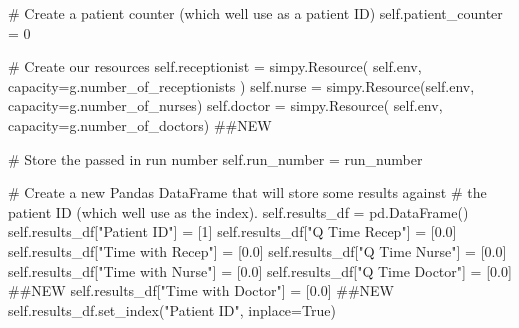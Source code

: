 \documentclass[
  letterpaper,
  DIV=11,
  numbers=noendperiod]{scrreprt}
\newenvironment{Shaded}{}{}
\newcommand{\CommentTok}[1]{\textcolor[rgb]{0.42,0.45,0.49}{#1}}
\newcommand{\DecValTok}[1]{\textcolor[rgb]{0.00,0.36,0.77}{#1}}
\newcommand{\FloatTok}[1]{\textcolor[rgb]{0.00,0.36,0.77}{#1}}
\newcommand{\NormalTok}[1]{\textcolor[rgb]{0.14,0.16,0.18}{#1}}
\newcommand{\OperatorTok}[1]{\textcolor[rgb]{0.14,0.16,0.18}{#1}}
\newcommand{\StringTok}[1]{\textcolor[rgb]{0.01,0.18,0.38}{#1}}
\newcommand{\VariableTok}[1]{\textcolor[rgb]{0.89,0.38,0.04}{#1}}
\begin{document}
\begin{tcolorbox}
\begin{Shaded}
\begin{Highlighting}[]
        \CommentTok{\# Create a patient counter (which we\textquotesingle{}ll use as a patient ID)}
        \VariableTok{self}\NormalTok{.patient\_counter }\OperatorTok{=} \DecValTok{0}

        \CommentTok{\# Create our resources}
        \VariableTok{self}\NormalTok{.receptionist }\OperatorTok{=}\NormalTok{ simpy.Resource(}
            \VariableTok{self}\NormalTok{.env, capacity}\OperatorTok{=}\NormalTok{g.number\_of\_receptionists}
\NormalTok{        )}
        \VariableTok{self}\NormalTok{.nurse }\OperatorTok{=}\NormalTok{ simpy.Resource(}\VariableTok{self}\NormalTok{.env, capacity}\OperatorTok{=}\NormalTok{g.number\_of\_nurses)}
        \VariableTok{self}\NormalTok{.doctor }\OperatorTok{=}\NormalTok{ simpy.Resource(}
            \VariableTok{self}\NormalTok{.env, capacity}\OperatorTok{=}\NormalTok{g.number\_of\_doctors) }\CommentTok{\#\#NEW}

        \CommentTok{\# Store the passed in run number}
        \VariableTok{self}\NormalTok{.run\_number }\OperatorTok{=}\NormalTok{ run\_number}

        \CommentTok{\# Create a new Pandas DataFrame that will store some results against}
        \CommentTok{\# the patient ID (which we\textquotesingle{}ll use as the index).}
        \VariableTok{self}\NormalTok{.results\_df }\OperatorTok{=}\NormalTok{ pd.DataFrame()}
        \VariableTok{self}\NormalTok{.results\_df[}\StringTok{"Patient ID"}\NormalTok{] }\OperatorTok{=}\NormalTok{ [}\DecValTok{1}\NormalTok{]}
        \VariableTok{self}\NormalTok{.results\_df[}\StringTok{"Q Time Recep"}\NormalTok{] }\OperatorTok{=}\NormalTok{ [}\FloatTok{0.0}\NormalTok{]}
        \VariableTok{self}\NormalTok{.results\_df[}\StringTok{"Time with Recep"}\NormalTok{] }\OperatorTok{=}\NormalTok{ [}\FloatTok{0.0}\NormalTok{]}
        \VariableTok{self}\NormalTok{.results\_df[}\StringTok{"Q Time Nurse"}\NormalTok{] }\OperatorTok{=}\NormalTok{ [}\FloatTok{0.0}\NormalTok{]}
        \VariableTok{self}\NormalTok{.results\_df[}\StringTok{"Time with Nurse"}\NormalTok{] }\OperatorTok{=}\NormalTok{ [}\FloatTok{0.0}\NormalTok{]}
        \VariableTok{self}\NormalTok{.results\_df[}\StringTok{"Q Time Doctor"}\NormalTok{] }\OperatorTok{=}\NormalTok{ [}\FloatTok{0.0}\NormalTok{] }\CommentTok{\#\#NEW}
        \VariableTok{self}\NormalTok{.results\_df[}\StringTok{"Time with Doctor"}\NormalTok{] }\OperatorTok{=}\NormalTok{ [}\FloatTok{0.0}\NormalTok{] }\CommentTok{\#\#NEW}
        \VariableTok{self}\NormalTok{.results\_df.set\_index(}\StringTok{"Patient ID"}\NormalTok{, inplace}\OperatorTok{=}\VariableTok{True}\NormalTok{)}


\end{Highlighting}
\end{Shaded}
\end{tcolorbox}
\end{document}
